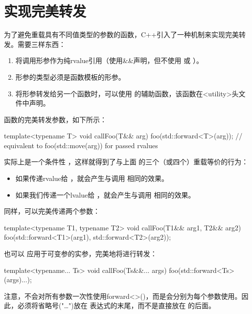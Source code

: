 \section{实现完美转发}
为了避免重载具有不同值类型的参数的函数，C++引入了一种机制来实现完美转发。需要三样东西：

\begin{enumerate}
	\item 将调用形参作为纯rvalue引用（使用\&\&声明，但不使用  或 ）。
	\item 形参的类型必须是函数模板的形参。
	\item 将形参转发给另一个函数时，可以使用  的辅助函数，该函数在<utility>头文件中声明。
\end{enumerate}

函数的完美转发参数，如下所示：

\begin{cppcode}
template<typename T>
void callFoo(T&& arg) {
	foo(std::forward<T>(arg)); // equivalent to foo(std::move(arg)) for passed rvalues
}
\end{cppcode}

 实际上是一个条件性 ，这样就得到了与上面  的三个（或四个）重载等价的行为：

\begin{itemize}
	\item 如果传递rvalue给 ，就会产生与调用  相同的效果。
	\item 如果我们传递一个lvalue给 ，就会产生与调用  相同的效果。
\end{itemize}

同样，可以完美传递两个参数：

\begin{cppcode}
template<typename T1, typename T2>
void callFoo(T1&& arg1, T2&& arg2) {
	foo(std::forward<T1>(arg1), std::forward<T2>(arg2));
}
\end{cppcode}

也可以  应用于可变参的实参，完美地将进行转发：

\begin{cppcode}
template<typename... Ts>
void callFoo(Ts&&... args) {
	foo(std::forward<Ts>(args)...);
}
\end{cppcode}

注意，不会对所有参数一次性使用forward<>()，而是会分别为每个参数使用。因此，必须将省略号("…")放在  表达式的末尾，而不是直接放在  的后面。

